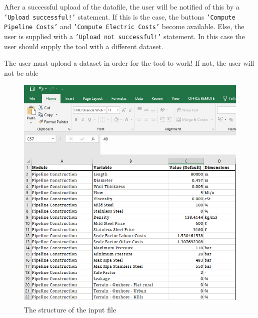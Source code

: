 \documentclass{article}
\begin{document}
 After a successful upload of the datafile, the user will be notified of this by a \texttt{'Upload successful!'} statement. If this is the case, the buttons \texttt{'Compute Pipeline Costs'} and \texttt{'Compute Electric Costs'} become available. Else, the user is supplied with a \texttt{'Upload not successful!'} statement. In this case the user should supply the tool with a different dataset.
 
 \begin{warn}
 	The user must upload a dataset in order for the tool to work! If not, the user will not be able 
 \end{warn}

\begin{figure}[b!]
  \centering
  \includegraphics[width=.63\linewidth]{input1.png}
  \caption{The structure of the input file}
  \label{fig:input1}
\end{figure}
\end{document}

